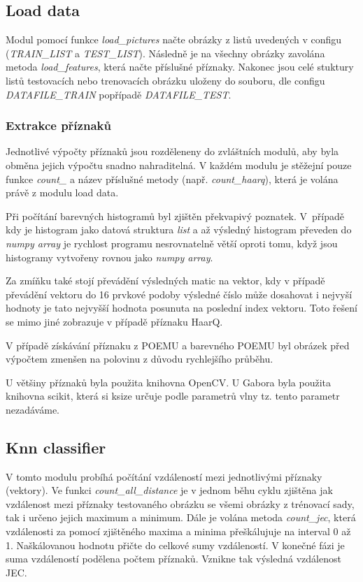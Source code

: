 \documentclass[czech,BP]{thesiskiv}
\begin{document}
\subsection{Load data}
\par Modul pomocí funkce \textit{load\_pictures} načte obrázky z listů uvedených v configu (\textit{TRAIN\_LIST} a \textit{TEST\_LIST}). Následně je na všechny obrázky zavolána metoda \textit{load\_features}, která načte příslušné příznaky. Nakonec jsou celé stuktury listů testovacích nebo trenovacích obrázku uloženy do souboru, dle configu \textit{DATAFILE\_TRAIN} popřípadě \textit{DATAFILE\_TEST}.


\subsubsection{Extrakce příznaků}
\par Jednotlivé výpočty příznaků jsou rozděleneny do zvláštních modulů, aby byla obměna jejich výpočtu snadno nahraditelná. V každém modulu je stěžejní pouze funkce \textit{count\_} a název příslušné metody (např. \textit{count\_haarq}), která je volána právě z modulu load data.

\par Při počítání barevných histogramů byl zjištěn překvapivý poznatek. V~případě kdy je histogram jako datová struktura \textit{list} a až výsledný histogram převeden do \textit{numpy array} je rychlost programu nesrovnatelně větší oproti tomu, když jsou histogramy vytvořeny rovnou jako \textit{numpy array}.  

\par Za zmíňku také stojí převádění výsledných matic na vektor, kdy v případě převádění vektoru do 16 prvkové podoby výsledné číslo může dosahovat i nejvyší hodnoty je tato nejvyšší hodnota posunuta na poslední index vektoru. Toto řešení se mimo jiné zobrazuje v případě příznaku HaarQ. 

\par V případě získávání příznaku z POEMU a barevného POEMU byl obrázek před výpočtem zmenšen na polovinu z důvodu rychlejšího průběhu.

\par U většiny příznaků byla použita knihovna OpenCV. U Gabora byla použita knihovna scikit, která si ksize určuje podle parametrů vlny tz. tento parametr nezadáváme.
   
  
\subsection{Knn classifier}
\par V tomto modulu probíhá počítání vzdáleností mezi jednotlivými příznaky (vektory). Ve funkci \textit{count\_all\_distance} je v jednom běhu cyklu zjištěna jak vzdálenost mezi příznaky testovaného obrázku se všemi obrázky z trénovací sady, tak i určeno jejich maximum a minimum. Dále je volána metoda \textit{count\_jec}, která vzdálenosti za pomocí zjištěného maxima a minima přeškálujuje na interval 0 až 1. Naškálovanou hodnotu přičte do celkové sumy vzdáleností. V konečné fázi je suma vzdáleností podělena počtem příznaků. Vznikne tak výsledná vzdálenost JEC.
    
\end{document}
